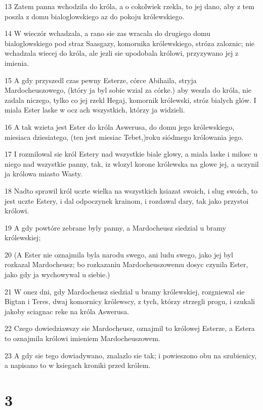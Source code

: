 \par 13 Zatem panna wchodzila do króla, a o cokolwiek rzekla, to jej dano, aby z tem poszla z domu bialoglowskiego az do pokoju królewskiego.
\par 14 W wieczór wchadzala, a rano sie zas wracala do drugiego domu bialoglowskiego pod straz Saasgazy, komornika królewskiego, stróza zaloznic; nie wchadzala wiecej do króla, ale jezli sie upodobala królowi, przyzywano jej z imienia.
\par 15 A gdy przyszedl czas pewny Esterze, córce Abihaila, stryja Mardocheuszowego, (który ja byl sobie wzial za córke.) aby weszla do króla, nie zadala niczego, tylko co jej rzekl Hegaj, komornik królewski, stróz bialych glów. I miala Ester laske w ocz ach wszystkich, którzy ja widzieli.
\par 16 A tak wzieta jest Ester do króla Aswerusa, do domu jego królewskiego, miesiaca dziesiatego, (ten jest miesiac Tebet,)roku siódmego królowania jego.
\par 17 I rozmilowal sie król Estery nad wszystkie biale glowy, a miala laske i milosc u niego nad wszystkie panny, tak, iz wlozyl korone królewska na glowe jej, a uczynil ja królowa miasto Wasty.
\par 18 Nadto sprawil król uczte wielka na wszystkich ksiazat swoich, i slug swoich, to jest uczte Estery, i dal odpoczynek krainom, i rozdawal dary, tak jako przystoi królowi.
\par 19 A gdy powtóre zebrane byly panny, a Mardocheusz siedzial u bramy królewskiej;
\par 20 (A Ester nie oznajmila byla narodu swego, ani ludu swego, jako jej byl rozkazal Mardocheusz; bo rozkazaniu Mardocheuszowemu dosyc czynila Ester, jako gdy ja wychowywal u siebie.)
\par 21 W onez dni, gdy Mardocheusz siedzial u bramy królewskiej, rozgniewal sie Bigtan i Teres, dwaj komornicy królewscy, z tych, którzy strzegli progu, i szukali jakoby sciagnac reke na króla Aswerusa.
\par 22 Czego dowiedziawszy sie Mardocheusz, oznajmil to królowej Esterze, a Estera to oznajmila królowi imieniem Mardocheuszowem.
\par 23 A gdy sie tego dowiadywano, znalazlo sie tak; i powieszono obu na szubienicy, a napisano to w ksiegach kroniki przed królem.

\chapter{3}

